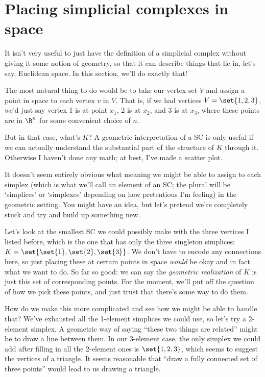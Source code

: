 \documentclass{lec}
\begin{document}
    \section{Placing simplicial complexes in space}

    It isn't very useful to just have the definition of a simplicial complex without giving it some notion of geometry, so that it can describe things that lie in, let's say, Euclidean space. In this section, we'll do exactly that!

    The most natural thing to do would be to take our vertex set $V$ and assign a point in space to each vertex $v$ in $V$. That is, if we had vertices $V = \set{1, 2, 3}$, we'd just say vertex 1 is at point $x_1$, 2 is at $x_2$, and 3 is at $x_3$, where these points are in $\R^n$ for some convenient choice of $n$.

    But in that case, what's $K$? A geometric interpretation of a SC is only useful if we can actually understand the substantial part of the structure of $K$ through it. Otherwise I haven't done any math; at best, I've made a scatter plot. 

    It doesn't seem entirely obvious what meaning we might be able to assign to each simplex (which is what we'll call an element of an SC; the plural will be `simplices' or `simplexes' depending on how pretentious I'm feeling) in the geometric setting. You might have an idea, but let's pretend we're completely stuck and try and build up something new.

    Let's look at the smallest SC we could possibly make with the three vertices I listed before, which is the one that has only the three singleton simplices: $K = \set{\set{1}, \set{2}, \set{3}}$. We don't have to encode any connections here, so just placing these at certain points in space \textit{would} be okay and in fact what we want to do. So far so good: we can say the \textit{geometric realization} of $K$ is just this set of corresponding points. For the moment, we'll put off the question of how we pick these points, and just trust that there's some way to do them.

    How do we make this more complicated and see how we might be able to handle that? We've exhausted all the 1-element simplices we could use, so let's try a 2-element simplex. A geometric way of saying ``these two things are related'' might be to draw a line between them. In our 3-element case, the only simplex we could add after filling in all the 2-element ones is $\set{1, 2, 3}$, which seems to suggest the vertices of a triangle. It seems reasonable that ``draw a fully connected set of three points'' would lead to us drawing a triangle.
\end{document}

